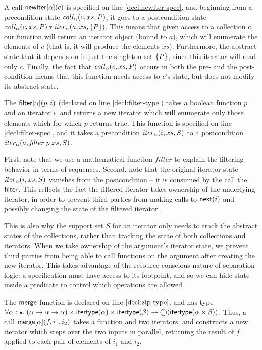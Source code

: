 A call $\mathsf{newiter}[\alpha](c)$ is specified on line
\ref{decl:newiter-spec}, and beginning from a precondition state
$\mathit{coll}_\alpha(c, xs, P)$, it goes to a postcondition state
$\mathit{coll}_\alpha(c, xs, P) * \mathit{iter}_\alpha(a, xs, \{{P}\})$.
This means that given access to a collection $c$, our function will
return an iterator object (bound to $a$), which will enumerate the
elements of $c$ (that is, it will produce the elements
$xs$). Furthermore, the abstract state that it depends on is just the
singleton set $\{{P}\}$, since this iterator will read only $c$.
Finally, the fact that $\mathit{coll}_\alpha(c, xs, P)$ occurs in both
the pre- and the post-condition means that this function needs 
access to $c$'s state, but does not modify its abstract state. 

The $\mathsf{filter}[\alpha](p, i)$ (declared on line \ref{decl:filter-type})
takes a boolean function $p$ and an iterator $i$, and returns a new
iterator which will enumerate only those elements which for which $p$
returns true. This function is specified on line \ref{decl:filter-spec}, 
and it takes a precondition $\mathit{iter}_\alpha(i, xs, S)$ to a postcondition
$\mathit{iter}_\alpha(a, \mathit{filter}\;p\;xs, S)$. 

First, note that we use a mathematical function $\mathit{filter}$ to
explain the filtering behavior in terms of sequences. Second, note
that the original iterator state $\mathit{iter}_\alpha(i, xs, S)$ vanishes
from the postcondition -- it is consumed by the call the
$\mathsf{filter}$.  This reflects the fact the filtered iterator takes
ownership of the underlying iterator, in order to prevent third
parties from making calls to $\mathsf{next}(i)$ and possibly changing the
state of the filtered iterator.

This is also why the support set $S$ for an iterator only needs to
track the abstract states of the collections, rather than tracking the
state of both collections and iterators. When we take ownership of the
argument's iterator state, we prevent third parties from being able to
call functions on the argument after creating the new iterator. This
takes advantage of the resource-conscious nature of separation logic:
a specification must have access to its footprint, and so we can hide
state inside a predicate to control which operations are allowed.

The $\mathsf{merge}$ function is declared on line $\ref{decl:zip-type}$, and
has type $\forall \alpha:\star.\; (\alpha \to \alpha \to \alpha) \times \mathsf{itertype}(\alpha) \times
\mathsf{itertype}(\beta) \to \bigcirc{(\mathsf{itertype}(\alpha \times \beta))}$.  Thus,
a call $\mathsf{merge}[\alpha](f, i_1, i_2)$ takes a function and two 
iterators, and constructs a new iterator which steps over the two inputs in parallel,
returning the result of $f$ applied to each pair of elements of $i_1$ and $i_2$. 

